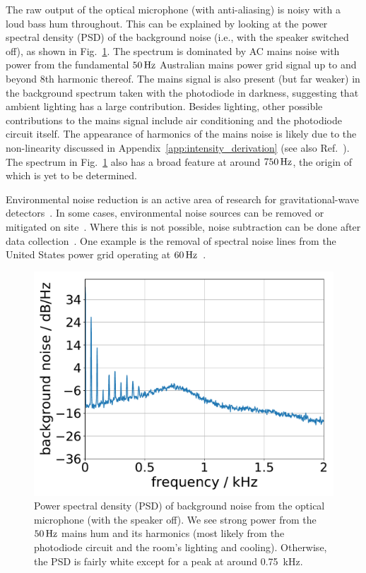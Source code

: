 \documentclass[paper-main.tex]{subfiles}
\begin{document}
The raw output of the optical microphone (with anti-aliasing) is noisy with a loud bass hum throughout. 
This can be explained by looking at the power spectral density (PSD) of the background noise (i.e., with the speaker switched off), as shown in Fig.~\ref{fig:psd_noise}. 
The spectrum is dominated by AC mains noise with power from the fundamental $50\,{\rm Hz}$ Australian mains power grid signal up to and beyond $8$th harmonic thereof. 
The mains signal is also present (but far weaker) in the background spectrum taken with the photodiode in darkness, suggesting that ambient lighting has a large contribution. 
Besides lighting, other possible contributions to the mains signal include air conditioning and the photodiode circuit itself. 
The appearance of harmonics of the mains noise is likely due to the non-linearity discussed in Appendix~\ref{app:intensity_derivation} (see also Ref.~\cite{feynman}). 
The spectrum in Fig.~\ref{fig:psd_noise} also has a broad feature at around $750\,{\rm Hz}$, the origin of which is yet to be determined.


Environmental noise reduction is an active area of research for gravitational-wave detectors~\cite{EfflerEtAl:2015}.
In some cases, environmental noise sources can be removed or mitigated on site~\cite{CovasEtAl:2018}. 
Where this is not possible, noise subtraction can be done after data collection~\cite{DriggersEtAl:2019, DavisEtAl:2019}. 
One example is the removal of spectral noise lines from the United States power grid operating at $60\,{\rm Hz}$~\cite{VajenteEtAl:2020}. %
 


\begin{figure}
	\includegraphics[width=.5\textwidth]{figures/psd_podo_14_6.pdf}
	\caption{\label{fig:psd_noise}
Power spectral density (PSD) of background noise from the optical microphone (with the speaker off). 
We see strong power from the $50\,{\rm Hz}$ mains hum and its harmonics (most likely from the photodiode circuit and the room’s lighting and cooling). Otherwise, the PSD is fairly white except for a peak at around 0.75~kHz. 
}
\end{figure}
\end{document}
